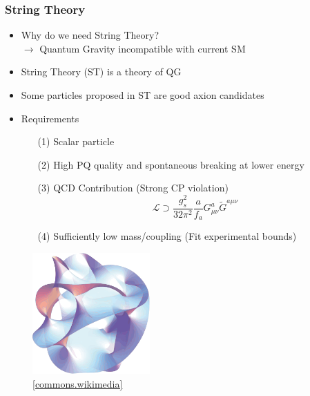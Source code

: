 \documentclass[aspectratio=1610, 9pt]{beamer}
\begin{document}
\begin{frame}
	\frametitle{String Theory}
	\begin{minipage}{0.55\textwidth}
		\begin{itemize}
			\item Why do we need String Theory?\\
			$\rightarrow$ Quantum Gravity incompatible with current SM
			\item String Theory (ST) is a theory of QG
			\item Some particles proposed in ST are good axion candidates\\
			\item Requirements
			\begin{itemize}
				\item[(1)] Scalar particle
				\item[(2)] High PQ quality and spontaneous breaking at lower energy
				\item[(3)] QCD Contribution (Strong CP violation)\\
				\begin{equation*}
					\mathcal{L} \supset \frac{g_s^2}{32 \pi^2} \frac{a}{f_a} G^a_{\mu \nu} \tilde{G}^{a \mu \nu}
				\end{equation*}
				\item[(4)] Sufficiently low mass/coupling (Fit experimental bounds)
			\end{itemize}			
			
		\end{itemize}
	\end{minipage}
	\hfill
	\begin{minipage}{0.4\textwidth}
		\begin{figure}
			\centering
			\includegraphics[width=4.5cm]{images/string.pdf}
			\caption{\href{https://en.wikipedia.org/wiki/File:Calabi_yau_formatted.svg}{[commons.wikimedia]}}
		\end{figure}
	\end{minipage}
\end{frame}
\end{document}
